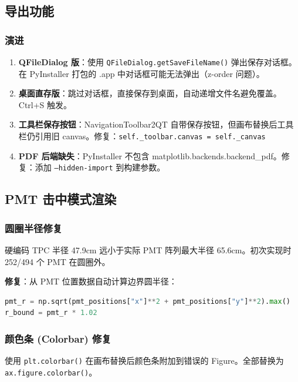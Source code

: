\documentclass[12pt,a4paper]{article}
\begin{document}
\subsection{导出功能}

\subsubsection{演进}

\begin{enumerate}[itemsep=2pt]
\item \textbf{QFileDialog 版}：使用 \texttt{QFileDialog.getSaveFileName()} 弹出保存对话框。在 PyInstaller 打包的 .app 中对话框可能无法弹出（z-order 问题）。
\item \textbf{桌面直存版}：跳过对话框，直接保存到桌面，自动递增文件名避免覆盖。Ctrl+S 触发。
\item \textbf{工具栏保存按钮}：NavigationToolbar2QT 自带保存按钮，但画布替换后工具栏仍引用旧 canvas。修复：\texttt{self.\_toolbar.canvas = self.\_canvas}
\item \textbf{PDF 后端缺失}：PyInstaller 不包含 matplotlib.backends.backend\_pdf。修复：添加 \texttt{--hidden-import} 到构建参数。
\end{enumerate}

\subsection{PMT 击中模式渲染}

\subsubsection{圆圈半径修复}

硬编码 TPC 半径 47.9cm 远小于实际 PMT 阵列最大半径 65.6cm。初次实现时 252/494 个 PMT 在圆圈外。

\textbf{修复}：从 PMT 位置数据自动计算边界圆半径：
\begin{lstlisting}[language=Python]
pmt_r = np.sqrt(pmt_positions["x"]**2 + pmt_positions["y"]**2).max()
r_bound = pmt_r * 1.02
\end{lstlisting}

\subsubsection{颜色条 (Colorbar) 修复}

使用 \texttt{plt.colorbar()} 在画布替换后颜色条附加到错误的 Figure。全部替换为 \texttt{ax.figure.colorbar()}。
\end{document}
